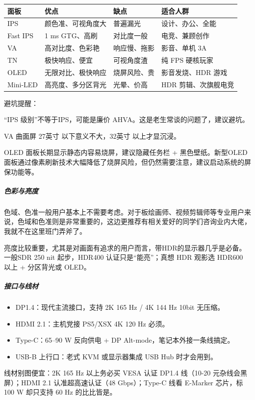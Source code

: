 \begin{table}[ht]
  \centering
  \begin{tabular}{l|l|l|l}
    \hline
    面板 & 优点 & 缺点 & 适合人群 \\
    \hline
    IPS & 颜色准、可视角度大 & 普遍漏光 & 设计、办公、全能 \\
    Fast IPS & 1 ms GTG、高刷 & 对比度一般 & 电竞、兼顾创作 \\
    VA & 高对比度、色彩艳 & 响应慢、拖影 & 影音、单机 3A \\
    TN & 极快响应、便宜 & 可视角度渣 & 纯 FPS 硬核玩家 \\
    OLED & 无限对比、极快响应 & 烧屏风险、贵 & 影音发烧、HDR 游戏 \\
    Mini-LED & 高亮度、多分区背光 & 光晕、价高 & HDR 剪辑、次旗舰电竞 \\
    \hline
  \end{tabular}
\end{table}

避坑提醒：

“IPS 级别”不等于IPS，可能是廉价 AHVA。这是老生常谈的问题了，建议避坑。

VA 曲面屏 27英寸 以下意义不大，32英寸 以上才显沉浸。

OLED 面板长期显示静态内容易烧屏，建议隐藏任务栏 + 黑色壁纸。新型OLED面板通过像素刷新技术大幅降低了烧屏风险，但仍然需要注意，建议启动系统的屏保功能等。

\subparagraph{色彩与亮度}

色域、色准一般用户基本上不需要考虑。对于板绘画师、视频剪辑师等专业用户来说，色域和色准则是非常重要的，这边更推荐有相关爱好的同学们咨询业内大佬，我就不在这里班门弄斧了。

亮度比较重要，尤其是对画面有追求的用户而言，带HDR的显示器几乎是必备。一般SDR 250 nit 起步，HDR400 认证只是“能亮”；真想 HDR 观影选 HDR600 以上 + 分区背光或 OLED。

\subparagraph{接口与线材}

\begin{itemize}
  \item DP1.4：现代主流接口，支持 2K 165 Hz / 4K 144 Hz 10bit 无压缩。
  \item HDMI 2.1：主机党接 PS5/XSX 4K 120 Hz 必须。
  \item Type-C：65–90 W 反向供电 + DP Alt-mode，笔记本外接一条线搞定。
  \item USB-B 上行口：老式 KVM 或显示器集成 USB Hub 时才会用到。
\end{itemize}

线材别图便宜：2K 165 Hz 以上务必买 VESA 认证 DP1.4 线（10-20 元杂线会黑屏）；HDMI 2.1 认准超高速认证（48 Gbps）；Type-C 线看 E-Marker 芯片，标 100 W 却只支持 60 Hz 的比比皆是。

